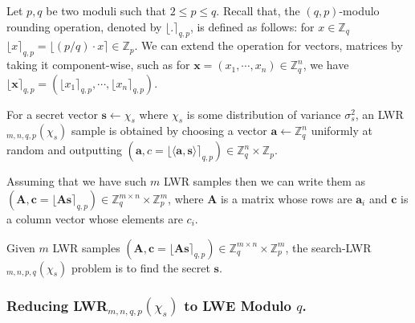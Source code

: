 \documentclass[runningheads]{llncs}
\begin{document}
Let $ p, q $ be two moduli such that $2 \leq p \leq q $. Recall that, the $(q,p)$-modulo rounding operation, denoted by $\lfloor. \rceil_{q,p}$, is defined as follows: for $x \in \mathbb{Z}_q$ $\lfloor x \rceil_{q,p}=\lfloor (p/q)\cdot x \rceil \in \mathbb{Z}_p$. We can extend the operation for vectors, matrices by taking it component-wise, such as for $\mathbf{x}=(x_{1},\cdots, x_{n}) \in \mathbb{Z}_q^n$, we have
$\lfloor \mathbf{x} \rceil_{q,p}=( \lfloor x_{1} \rceil_{q,p},\cdots,\lfloor x_{n} \rceil_{q,p}).$

\begin{definition}
 For a secret vector $\mathbf{s} \leftarrow \chi_s$ where $\chi_s$ is some distribution of variance $\sigma^2_s$, an LWR$_{m,n,q,p}(\chi_s)$ sample is obtained by choosing a vector $\mathbf{a} \leftarrow \mathbb{Z}_q^n$ uniformly at random and outputting $(\mathbf{a},c=\lfloor\langle \mathbf{a},\mathbf{s} \rangle \rceil_{q,p})\in \mathbb{Z}_q^n \times \mathbb{Z}_p$.
\end{definition}
Assuming that we have such $m$ LWR samples then we can write them as $(\mathbf{A},\mathbf{c}=\lfloor \mathbf{A}\mathbf{s}  \rceil_{q,p}) \in \mathbb{Z}_q^{m \times n} \times \mathbb{Z}_p^m$, where $\mathbf{A}$ is a matrix whose rows are $\mathbf{a}_i$ and $\mathbf{c}$ is a column vector whose elements are $c_i$.

\begin{definition} 
Given $m$ LWR samples  $(\mathbf{A},\mathbf{c}=\lfloor \mathbf{A}\mathbf{s}  \rceil_{q,p}) \in \mathbb{Z}_q^{m \times n} \times \mathbb{Z}_p^m$, the search-LWR$_{m,n,p,q}(\chi_s)$ problem is to find the secret $\mathbf{s}$.
\end{definition}

\subsubsection{Reducing LWR$_{m,n,q,p}(\chi_s)$ to LWE Modulo $q$.} 
\end{document}
